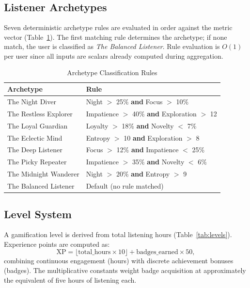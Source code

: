 \documentclass[conference]{IEEEtran}
\begin{document}
\subsection{Listener Archetypes}

Seven deterministic archetype rules are evaluated in order against the
metric vector (Table~\ref{tab:archetypes}). The first matching rule
determines the archetype; if none match, the user is classified as
\textit{The Balanced Listener}. Rule evaluation is $O(1)$ per user since
all inputs are scalars already computed during aggregation.

\begin{table}[ht]
\caption{Archetype Classification Rules}
\label{tab:archetypes}
\centering
\renewcommand{\arraystretch}{1.15}
\begin{tabular}{lp{4.5cm}}
\toprule
\textbf{Archetype} & \textbf{Rule} \\
\midrule
The Night Diver       & Night $>$ 25\% \textbf{and} Focus $>$ 10\% \\
The Restless Explorer & Impatience $>$ 40\% \textbf{and} Exploration $>$ 12 \\
The Loyal Guardian    & Loyalty $>$ 18\% \textbf{and} Novelty $<$ 7\% \\
The Eclectic Mind     & Entropy $>$ 10 \textbf{and} Exploration $>$ 8 \\
The Deep Listener     & Focus $>$ 12\% \textbf{and} Impatience $<$ 25\% \\
The Picky Repeater    & Impatience $>$ 35\% \textbf{and} Novelty $<$ 6\% \\
The Midnight Wanderer & Night $>$ 20\% \textbf{and} Entropy $>$ 9 \\
The Balanced Listener & Default (no rule matched) \\
\bottomrule
\end{tabular}
\end{table}

\subsection{Level System}

A gamification level is derived from total listening hours
(Table~\ref{tab:levels}). Experience points are computed as:
\begin{equation}
  \text{XP} = \lfloor \text{total\_hours} \times 10 \rfloor + \text{badges\_earned} \times 50,
\end{equation}
combining continuous engagement (hours) with discrete achievement bonuses
(badges). The multiplicative constants weight badge acquisition at
approximately the equivalent of five hours of listening each.
\end{document}
